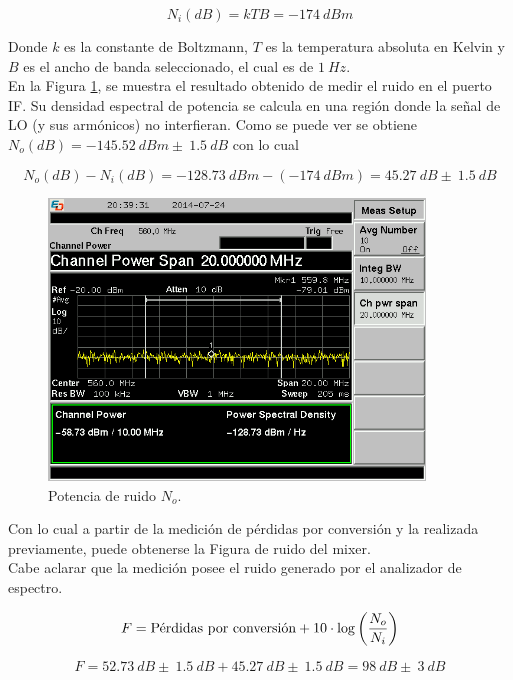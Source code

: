 \documentclass[a4paper,10pt]{article}
\begin{document}
	$$N_i(dB)=kTB=-174~dBm$$
		
	Donde $k$ es la constante de Boltzmann, $T$ es la temperatura absoluta en 
	Kelvin y $B$ es el ancho de banda seleccionado, el cual es de $1~Hz$. \\
	\indent En la Figura \ref{noise}, se muestra el resultado obtenido de medir 
	el ruido en el puerto IF. Su densidad espectral de potencia se calcula en 
	una regi\'on donde la se\~nal de LO (y sus arm\'onicos) no interfieran. Como
	se puede ver se obtiene $N_o(dB)=-145.52~dBm\pm~1.5~dB$ con lo cual
		
	$$N_o(dB)-N_i(dB)=-128.73~dBm-(-174~dBm)=45.27~dB\pm~1.5~dB$$			
	
	\begin{figure}[!htb]
		\centering
		\includegraphics[width=10cm]{Images/SCREN542.png}
		\caption{Potencia de ruido $N_o$.}
		\label{noise}
	\end{figure}
	
	\indent Con lo cual a partir de la medici\'on de p\'erdidas por conversi\'on
	y la realizada previamente, puede obtenerse la Figura de ruido del mixer. \\
	\indent Cabe aclarar que la medición posee el ruido generado por el 
	analizador de espectro.
	
	$$F=\textmd{P\'erdidas por conversi\'on}+10\cdot\log\left(\frac{N_o}{N_i}
	\right)$$
	
	$$F=52.73~dB\pm~1.5~dB+45.27~dB\pm~1.5~dB=98~dB\pm~3~dB$$
	
\end{document}
